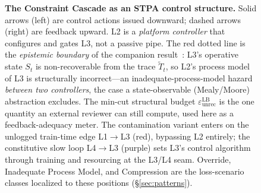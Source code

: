 \begin{figure}[t]
{%
}
\caption{\textbf{The Constraint Cascade as an STPA control structure.} Solid arrows (left) are control actions issued downward; dashed arrows (right) are feedback upward. L2 is a \emph{platform controller} that configures and gates L3, not a passive pipe. The red dotted line is the \emph{epistemic boundary} of the companion result~\cite{anon2026dual}: L3's operative state $S_t$ is non-recoverable from the trace $\tilde T_t$, so L2's process model of L3 is structurally incorrect---an inadequate-process-model hazard \emph{between two controllers}, the case a state-observable (Mealy/Moore) abstraction excludes. The min-cut structural budget $\varepsilon_{\mathrm{unrec}}^{\mathrm{LB}}$ is the one quantity an external reviewer can still compute, used here as a feedback-adequacy meter. The contamination variant enters on the unlogged train-time edge L1$\to$L3 (red), bypassing L2 entirely; the constitutive slow loop L4$\to$L3 (purple) sets L3's control algorithm through training and resourcing at the L3/L4 seam. Override, Inadequate Process Model, and Compression are the loss-scenario classes localized to these positions (\S\ref{sec:patterns}).}
\label{fig:cascade}
\end{figure}
